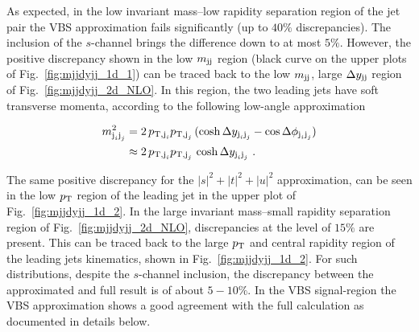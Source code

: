 As expected, in the low invariant mass--low rapidity separation region of the jet pair the VBS approximation fails significantly (up to $40\%$ discrepancies).
The inclusion of the $s$-channel brings the difference down to at most $5\%$.
However, the positive discrepancy shown in the low $m_{\text{j}\text{j}}$ region (black curve on the upper plots of Fig.~\ref{fig:mjjdyjj_1d_1}) can be traced back to the low $m_{\text{j}\text{j}}$, large $\Delta y_{\text{j}\text{j}}$ region of Fig.~\ref{fig:mjjdyjj_2d_NLO}.
In this region, the two leading jets have soft transverse momenta, according to the following low-angle approximation

\begin{equation}
\begin{split}
m_{\text{j}_i\text{j}_j}^2 &= 2\,p_{\text{T},\text{j}_i}p_{\text{T},\text{j}_j}\,(\cosh \Delta y_{\text{j}_i\text{j}_j} - \cos \Delta\phi_{\text{j}_i\text{j}_j}) \\
&\approx 2\,p_{\text{T},\text{j}_i}p_{\text{T},\text{j}_j}\,\cosh \Delta y_{\text{j}_i\text{j}_j} \,\,.
\end{split}
\end{equation}

The same positive discrepancy for the $|s|^2 + |t|^2 + |u|^2$ approximation, can be seen in the low $p_\text{T}$ region of the leading jet in the upper plot of Fig.~\ref{fig:mjjdyjj_1d_2}.
In the large invariant mass--small rapidity separation region of Fig.~\ref{fig:mjjdyjj_2d_NLO}, discrepancies at the level of $15\%$ are present.
This can be traced back to the large $p_\text{T}$ and central rapidity region of the leading jets kinematics, shown in Fig.~\ref{fig:mjjdyjj_1d_2}.
For such distributions, despite the $s$-channel inclusion, the discrepancy between the approximated and full result is of about $5-10\%$.
In the VBS signal-region the VBS approximation shows a good agreement with the full calculation as documented in details below.

